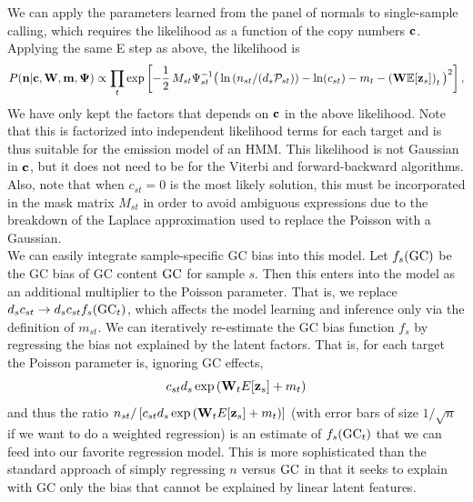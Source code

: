 \documentclass[nofootinbib,amssymb,amsmath]{revtex4}
\newcommand{\vc}{{\bf c}}
\newcommand{\vz}{{\bf z}}
\newcommand{\vn}{{\bf n}}
\newcommand{\vm}{{\bf m}}
\newcommand{\vW}{{\bf W}}
\newcommand{\vPsi}{{\bf \Psi}}
\newcommand{\PP}{\mathcal{P}}
\newcommand{\EE}{\mathbb{E}}
\begin{document}
We can apply the parameters learned from the panel of normals to single-sample calling, which requires the likelihood as a function of the copy numbers $\vc$.  Applying the same E step as above, the likelihood is
\begin{equation}
P(\vn | \vc, \vW, \vm, \vPsi) \propto \prod_t \exp \left[ -\frac{1}{2} \, M_{st} \Psi_{st}^{-1} \big( \ln \left( n_{st} / (d_s \PP_{st}) \right) - \ln(c_{st}) - m_t - \left(\vW \EE[\vz_{s}]\right)_t \big)^2 \right],
\end{equation}
We have only kept the factors that depends on $\vc$ in the above likelihood. Note that this is factorized into independent likelihood terms for each target and is thus suitable for the emission model of an HMM.  This likelihood is not Gaussian in $\vc$, but it does not need to be for the Viterbi and forward-backward algorithms. Also, note that when $c_{st} = 0$ is the most likely solution, this must be incorporated in the mask matrix $M_{st}$ in order to avoid ambiguous expressions due to the breakdown of the Laplace approximation used to replace the Poisson with a Gaussian.\\

We can easily integrate sample-specific GC bias into this model.  Let $f_s({\rm GC})$ be the GC bias of GC content ${\rm GC}$ for sample $s$.  Then this enters into the model as an additional multiplier to the Poisson parameter.  That is, we replace $d_s c_{st} \rightarrow d_s c_{st} f_s({\rm GC}_t)$, which affects the model learning and inference only via the definition of $m_{st}$.  We can iteratively re-estimate the GC bias function $f_s$ by regressing the bias not explained by the latent factors.  That is, for each target the Poisson parameter is, ignoring GC effects,
\begin{equation}
c_{st} d_s \exp \left( \vW_t E[\vz_s] + m_t \right)
\end{equation}
and thus the ratio $n_{st} / \left[ c_{st} d_s \exp \left( \vW_t E[\vz_s] + m_t \right) \right]$ (with error bars of size $1/\sqrt{n}$ if we want to do a weighted regression) is an estimate of $f_s({\rm GC}_t)$ that we can feed into our favorite regression model.  This is more sophisticated than the standard approach of simply regressing $n$ versus ${\rm GC}$ in that it seeks to explain with GC only the bias that cannot be explained by linear latent features.

\appendix
\end{document}
